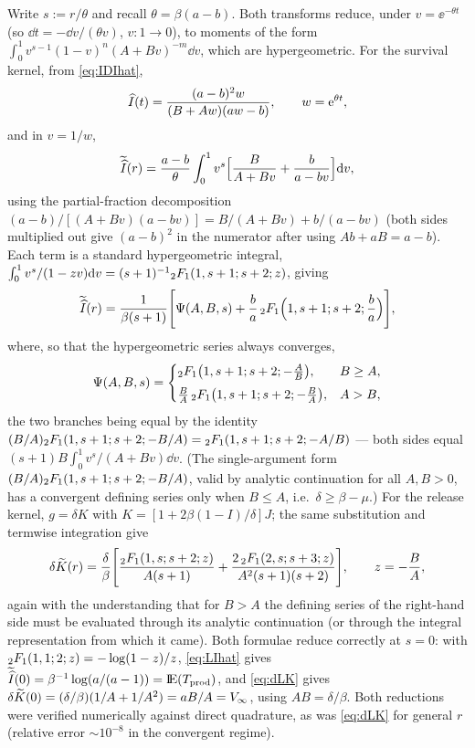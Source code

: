 Write $s:=r/\theta$ and recall $\theta=\beta(a-b)$. Both transforms reduce,
under $v=\ee^{-\theta t}$ (so $\dd t=-\dd v/(\theta v)$, $v:1\to0$), to
moments of the form $\int_0^1 v^{s-1}(1-v)^n(A+Bv)^{-m}\dd v$, which are
hypergeometric. For the survival kernel, from \eqref{eq:IDIhat},
$$
\widehat{I}(t)=\frac{(a-b)^2w}{(B+Aw)(aw-b)},\qquad w={\rm e}^{\theta t},
$$
and in $v=1/w$,
$$
\widetilde{\widehat{I}}(r)=\frac{a-b}{\theta}\int_0^1 v^s
\Bigl[\frac{B}{A+Bv}+\frac{b}{a-bv}\Bigr]{\rm d} v,
$$
using the partial-fraction decomposition
$(a-b)/[(A+Bv)(a-bv)]=B/(A+Bv)+b/(a-bv)$ (both sides multiplied out give
$(a-b)^2$ in the numerator after using $Ab+aB=a-b$). Each term is a
standard hypergeometric integral,
$\int_0^1 v^s/(1-zv){\rm d} v=(s+1)^{-1}{}_2F_1(1,s+1;s+2;z)$, giving
\begin{equation}
\widetilde{\widehat{I}}(r)=\frac{1}{\beta(s+1)}
\Biggl[
\Psi(A,B,s)
+\frac{b}{a}\,{}_2F_1\Bigl(1,s+1;s+2;\frac{b}{a}\Bigr)
\Biggr],
\label{eq:LIhat}
\end{equation}
where, so that the hypergeometric series always converges,
\begin{equation}
\Psi(A,B,s)=
\begin{cases}
{}_2F_1\bigl(1,s+1;s+2;-\frac{A}{B}\bigr), & B\ge A,\\[0.4em]
\frac{B}{A}\,{}_2F_1\bigl(1,s+1;s+2;-\frac{B}{A}\bigr), & A>B,
\end{cases}
\end{equation}
the two branches being equal by the identity
$(B/A){}_2F_1(1,s+1;s+2;-B/A)={}_2F_1(1,s+1;s+2;-A/B)$ --- both sides equal
$(s+1)B\int_0^1 v^s/(A+Bv)\dd v$. (The single-argument form
$(B/A){}_2F_1(1,s+1;s+2;-B/A)$, valid by analytic continuation for all
$A,B>0$, has a convergent defining series only when $B\le A$, i.e.\
$\delta\ge\beta-\mu$.) For the release kernel, $g=\delta K$ with
$K=[1+2\beta(1-I)/\delta]J$; the same substitution and termwise
integration give
\begin{equation}
\delta\widetilde{K}(r)=\frac{\delta}{\beta}
\Biggl[
\frac{{}_2F_1(1,s;s+2;z)}{A(s+1)}
+\frac{2\,{}_2F_1(2,s;s+3;z)}{A^2(s+1)(s+2)}
\Biggr],
\qquad z=-\frac{B}{A},
\label{eq:dLK}
\end{equation}
again with the understanding that for $B>A$ the defining series of the
right-hand side must be evaluated through its analytic continuation (or
through the integral representation from which it came). Both formulae
reduce correctly at $s=0$: with ${}_2F_1(1,1;2;z)=-\log(1-z)/z$,
\eqref{eq:LIhat} gives
$\widetilde{\widehat{I}}(0)=\beta^{-1}\log(a/(a-1))={\rm I}\!{\rm E}(T_{\rm prod})$, and
\eqref{eq:dLK} gives $\delta\widetilde{K}(0)=(\delta/\beta)(1/A+1/A^2)
=aB/A=V_\infty$, using $AB=\delta/\beta$. Both reductions were verified
numerically against direct quadrature, as was \eqref{eq:dLK} for general
$r$ (relative error $\sim10^{-8}$ in the convergent regime).


